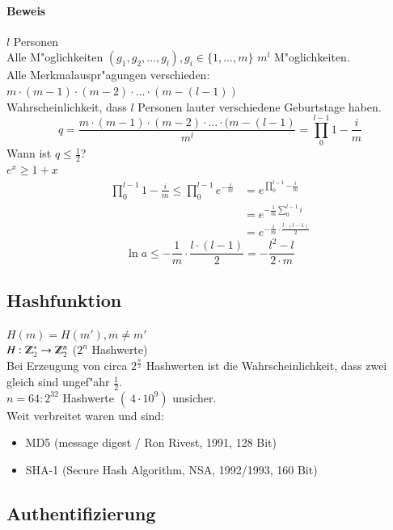 \paragraph{Beweis}

$l$ Personen\\
Alle M"oglichkeiten $(g_1,g_2,\ldots,g_l), g_i \in \{1,\ldots,m\}$ $m^l$ M"oglichkeiten.\\
Alle Merkmalauspr"agungen verschieden: $m \cdot (m-1) \cdot (m-2) \cdot \ldots \cdot (m-(l-1))$\\
Wahrscheinlichkeit, dass $l$ Personen lauter verschiedene Geburtstage haben.\\
\[
q = \frac{m \cdot (m-1) \cdot (m-2) \cdot \ldots \cdot (m-(l-1)}{m^l}=\prod^{l-1}_0{1 - \frac{i}{m}}
\]
Wann ist $q \leq \frac{1}{2}$?\\
$e^x \geq 1+x$\\
\begin{align*}
	\prod^{l-1}_0{1 - \frac{i}{m}}
	\leq \prod^{l-1}_0{e^{-\frac{i}{m}}}
	&=e^{\prod^{l-1}_0{-\frac{i}{m}}} \\
	&=e^{- \frac{1}{m}\sum^{l-1}_0{i}} \\
	&=e^{- \frac{1}{m} \cdot \frac{l \cdot (l-1)}{2}}
\end{align*}
\[
	\ln{a}\leq - \frac{1}{m} \cdot \frac{l \cdot (l-1)}{2} = - \frac{l^2-l}{2 \cdot m}
\]

\subsection{Hashfunktion}

$H(m) = H(m'), m \neq m'$\\
$H: \Z_2^* \rightarrow \Z_2^n$ ($2^n$ Hashwerte)\\
Bei Erzeugung von circa $2^\frac{n}{2}$ Hashwerten ist die Wahrscheinlichkeit,
dass zwei gleich sind ungef"ahr $\frac{1}{2}$.\\ 
$n=64 : 2^{32}$ Hashwerte $(~4 \cdot 10^9)$ unsicher.\\
Weit verbreitet waren und sind:
\begin{itemize}
	\item[] MD5 (message digest / Ron Rivest, 1991, 128 Bit)
	\item[] SHA-1 (Secure Hash Algorithm, NSA, 1992/1993, 160 Bit)
\end{itemize}

\subsection{Authentifizierung}


